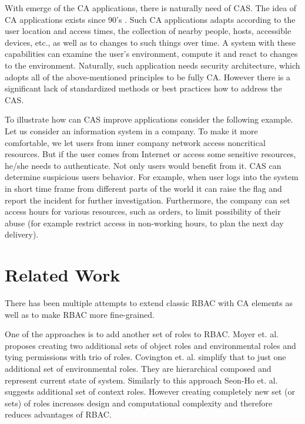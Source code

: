 \documentclass{sig-alternate}
\begin{document}
With emerge of the CA applications, there is naturally need of CAS. The idea of CA applications exists since 90's \cite{contextaware}. Such CA applications adapts according to the user location and access times, the collection of nearby people, hosts, accessible devices, etc., as well as to changes to such things over time. A system with these capabilities can examine the user's environment, compute it and react to changes to the environment. Naturally, such application needs security architecture, which adopts all of the above-mentioned principles to be fully CA. However there is a significant lack of standardized methods or best practices how to address the CAS.

To illustrate how can CAS improve applications consider the following example. Let us consider an information system in a company. To make it more comfortable, we let users from inner company network access noncritical resources. But if the user comes from Internet or access some sensitive resources, he/she needs to authenticate. Not only users would benefit from it. CAS can determine suspicious users behavior. For example, when user logs into the system in short time frame from different parts of the world it can raise the flag and report the incident for further investigation. Furthermore, the company can set access hours for various resources, such as orders, to limit possibility of their abuse (for example restrict access in non-working hours, to plan the next day delivery).

\section{Related Work}
There has been multiple attempts to extend classic RBAC with CA elements as well as to make RBAC more fine-grained.

One of the approaches is to add another set of roles to RBAC. Moyer et. al. \cite{grbac} proposes creating two additional sets of object roles and environmental roles and tying permissions with trio of roles. Covington et. al. \cite{envroles} simplify that to just one additional set of environmental roles. They are hierarchical composed and represent current state of system. Similarly to this approach Seon-Ho et. al. \cite{contextroles} suggests additional set of context roles. However creating completely new set (or sets) of roles increases design and computational complexity and therefore reduces advantages of RBAC.
\end{document}
